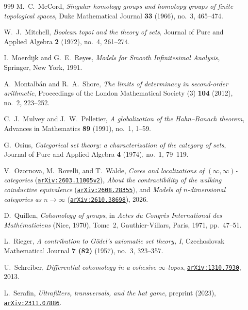 \begin{thebibliography}{999}
M.~C.~McCord,
\emph{Singular homology groups and homotopy groups of finite topological spaces},
Duke Mathematical Journal \textbf{33} (1966), no.~3, 465--474.

W.~J.~Mitchell,
\emph{Boolean topoi and the theory of sets},
Journal of Pure and Applied Algebra \textbf{2} (1972), no.~4, 261--274.

I.~Moerdijk and G.~E.~Reyes,
\emph{Models for Smooth Infinitesimal Analysis},
Springer, New York, 1991.

A.~Montalb\'an and R.~A.~Shore,
\emph{The limits of determinacy in second-order arithmetic},
Proceedings of the London Mathematical Society (3) \textbf{104} (2012), no.~2, 223--252.

C.~J.~Mulvey and J.~W.~Pelletier,
\emph{A globalization of the Hahn--Banach theorem},
Advances in Mathematics \textbf{89} (1991), no.~1, 1--59.

G.~Osius,
\emph{Categorical set theory: a characterization of the category of sets},
Journal of Pure and Applied Algebra \textbf{4} (1974), no.~1, 79--119.

V.~Ozornova, M.~Rovelli, and T.~Walde,
\emph{Cores and localizations of $(\infty, \infty)$-categories} (\href{https://arxiv.org/abs/2603.11005v2}{\texttt{arXiv:2603.11005v2}}),
\emph{About the contractibility of the walking coinductive equivalence} (\href{https://arxiv.org/abs/2608.28355}{\texttt{arXiv:2608.28355}}), and
\emph{Models of $n$-dimensional categories as $n \to \infty$} (\href{https://arxiv.org/abs/2610.38698}{\texttt{arXiv:2610.38698}}), 2026.

D.~Quillen,
\emph{Cohomology of groups},
in \emph{Actes du Congr\`es International des Math\'ematiciens} (Nice, 1970), Tome~2, Gauthier-Villars, Paris, 1971, pp.~47--51.

L.~Rieger,
\emph{A contribution to G\"odel's axiomatic set theory, I},
Czechoslovak Mathematical Journal \textbf{7 (82)} (1957), no.~3, 323--357.

U.~Schreiber,
\emph{Differential cohomology in a cohesive $\infty$-topos},
\href{https://arxiv.org/abs/1310.7930}{\texttt{arXiv:1310.7930}}, 2013.

L.~Serafin,
\emph{Ultrafilters, transversals, and the hat game},
preprint (2023), \href{https://arxiv.org/abs/2311.07886}{\texttt{arXiv:2311.07886}}.


\end{thebibliography}
